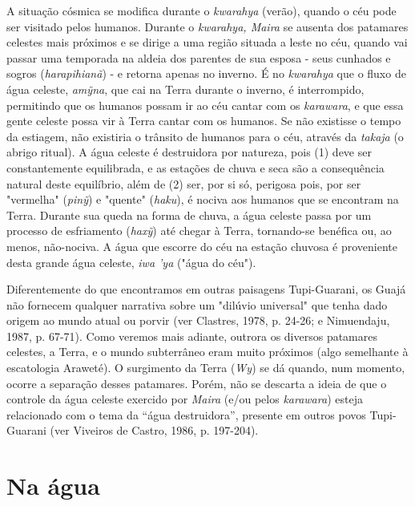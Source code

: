 A situação cósmica se modifica durante o \emph{kwarahya} (verão), quando
o céu pode ser visitado pelos humanos. Durante o \emph{kwarahya, Maira}
se ausenta dos patamares celestes mais próximos e se dirige a uma região
situada a leste no céu, quando vai passar uma temporada na aldeia dos
parentes de sua esposa - seus cunhados e sogros (\emph{harapihianã}) - e
retorna apenas no inverno. É no \emph{kwarahya} que o fluxo de água
celeste, \emph{amỹna}, que cai na Terra durante o inverno, é
interrompido, permitindo que os humanos possam ir ao céu cantar com os
\emph{karawara}, e que essa gente celeste possa vir à Terra cantar com
os humanos. Se não existisse o tempo da estiagem, não existiria o
trânsito de humanos para o céu, através da \emph{takaja} (o abrigo
ritual). A água celeste é destruidora por natureza, pois (1) deve ser
constantemente equilibrada, e as estações de chuva e seca são a
consequência natural deste equilíbrio, além de (2) ser, por si só,
perigosa pois, por ser "vermelha" (\emph{pinỹ}) e "quente"
(\emph{haku}), é nociva aos humanos que se encontram na Terra. Durante
sua queda na forma de chuva, a água celeste passa por um processo de
esfriamento (\emph{haxỹ}) até chegar à Terra, tornando-se benéfica ou,
ao menos, não-nociva. A água que escorre do céu na estação chuvosa é
proveniente desta grande água celeste, \emph{iwa 'ya} ("água do céu").

Diferentemente do que encontramos em outras paisagens Tupi-Guarani, os
Guajá não fornecem qualquer narrativa sobre um "dilúvio universal" que
tenha dado origem ao mundo atual ou porvir (ver Clastres, 1978, p.
24-26; e Nimuendaju, 1987, p. 67-71). Como veremos mais adiante, outrora
os diversos patamares celestes, a Terra, e o mundo subterrâneo eram
muito próximos (algo semelhante à escatologia Araweté). O surgimento da
Terra (\emph{Wy}) se dá quando, num momento, ocorre a separação desses
patamares. Porém, não se descarta a ideia de que o controle da água
celeste exercido por \emph{Maira} (e/ou pelos \emph{karawara}) esteja
relacionado com o tema da ``água destruidora'', presente em outros povos
Tupi-Guarani (ver Viveiros de Castro, 1986, p. 197-204).

\section{Na água}\label{na-uxe1gua}

